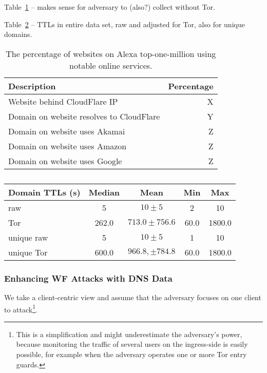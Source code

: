 Table~\ref{tab:dns-overview} -- makes sense for adversary to (also?) collect
without Tor.

Table~\ref{tab:daw-ttls} -- TTLs in entire data set, raw and adjusted for Tor,
also for unique domains. 

\begin{table}[t]
	\centering
	\begin{tabular}{l r}
	\toprule
	\textbf{Description} & \textbf{Percentage} \\
	\midrule
	Website behind CloudFlare IP & X \\
	Domain on website resolves to CloudFlare & Y \\
	Domain on website uses Akamai & Z \\
	Domain on website uses Amazon & Z \\
	Domain on website uses Google & Z \\
	\bottomrule
	\end{tabular}
	\caption{The percentage of websites on Alexa top-one-million using notable
	online services.}
	\label{tab:dns-overview}
\end{table}

\begin{table}[t]
	\centering
	\begin{tabular}{l c c c c}
	\toprule
	\textbf{Domain TTLs (s)} & \textbf{Median} & \textbf{Mean} & \textbf{Min} & \textbf{Max} \\
	\midrule
	raw & 5 & $10 \pm 5$ & 2 & 10 \\
	Tor & 262.0 & $713.0 \pm 756.6$ & 60.0 & 1800.0 \\
	unique raw & 5 & $10 \pm 5$ & 1 & 10 \\
	unique Tor & 600.0 & $966.8, \pm 784.8$ & 60.0 & 1800.0 \\
	\bottomrule
	\end{tabular}
	\caption{}
	\label{tab:daw-ttls}
\end{table}


\subsubsection{Enhancing WF Attacks with DNS Data}

We take a client-centric view and assume that the adversary focuses on
one client to attack\footnote{This is a simplification and might underestimate
the adversary's power, because monitoring the traffic of several users
on the ingress-side is easily possible, for example when the adversary
operates one or more Tor entry guards.}.


